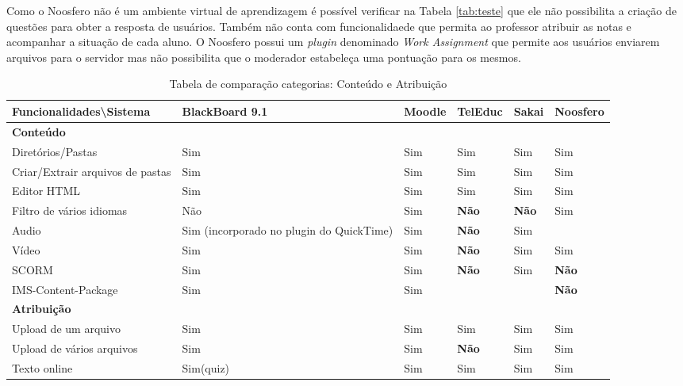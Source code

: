 Como o Noosfero não é um ambiente virtual de aprendizagem é possível verificar na Tabela \ref{tab:teste} que ele não possibilita a criação de questões para obter a resposta de usuários. Também não conta com funcionalidaede que permita ao professor atribuir as notas e acompanhar a situação de cada aluno. O Noosfero possui um \textit{plugin} denominado \textit{Work Assignment} que permite aos usuários enviarem arquivos para o servidor mas não possibilita que o moderador estabeleça uma pontuação para os mesmos.

\begin{landscape}
\begin{table}[H]
\begin{center}
\begin{tabular}{|@{}p{5.5cm}|p{3.5cm}|p{3.5cm}|p{3.5cm}|p{3.5cm}|p{3.5cm}@{}|}
\hline
\textbf{Funcionalidades\textbackslash Sistema} & \textbf{BlackBoard 9.1} & \textbf{Moodle} & \textbf{TelEduc} & \textbf{Sakai} & \textbf{Noosfero}\\ \hline
\textbf{Conteúdo} &  &  &  &  &  \\
Diretórios/Pastas & Sim & Sim & Sim & Sim & Sim \\
Criar/Extrair arquivos de pastas & Sim & Sim & Sim & Sim & Sim \\
Editor HTML & Sim & Sim & Sim & Sim & Sim \\
Filtro de vários idiomas & Não & Sim & \textbf{Não} & \textbf{Não} & Sim \\
Audio & Sim {\tiny (incorporado no plugin do QuickTime)} & Sim & \textbf{Não} & Sim &  \\
Vídeo & Sim & Sim & \textbf{Não} & Sim & Sim \\
SCORM & Sim & Sim & \textbf{Não} & Sim & \textbf{Não} \\
IMS-Content-Package & Sim & Sim &  &  & \textbf{Não} \\
\textbf{Atribuição} &  &  &  &  &  \\
Upload de um arquivo & Sim & Sim & Sim & Sim & Sim \\
Upload de vários arquivos & Sim & Sim & \textbf{Não} & Sim & Sim \\
Texto online & Sim(quiz) & Sim & Sim & Sim & Sim \\ \hline
\end{tabular}
\caption{Tabela de comparação categorias: Conteúdo e Atribuição}
\label{tab:conteudo-atribuicao}
\end{center}
\end{table}


\end{landscape}
